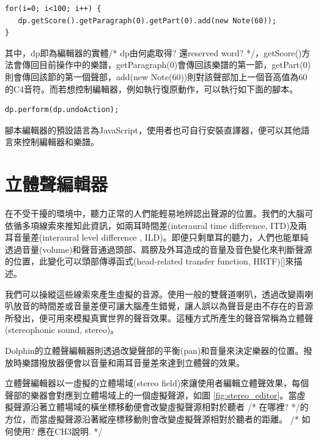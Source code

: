 \documentclass[12pt,a4paper,oneside]{report}
\begin{document}
\begin{verbatim}
for(i=0; i<100; i++) { 
   dp.getScore().getParagraph(0).getPart(0).add(new Note(60));
}
\end{verbatim}

其中，dp即為編輯器的實體/* dp由何處取得? 還reserved word?  */，getScore()方法會傳回目前操作中的樂譜，getParagraph(0)會傳回該樂譜的第一節，getPart(0)則會傳回該節的第一個聲部，add(new Note(60))則對該聲部加上一個音高值為60的C4音符。而若想控制編輯器，例如執行復原動作，可以執行如下面的腳本。

\begin{verbatim}
dp.perform(dp.undoAction);
\end{verbatim}

腳本編輯器的預設語言為JavaScript，使用者也可自行安裝直譯器，便可以其他語言來控制編輯器和樂譜。

\section{立體聲編輯器}

在不受干擾的環境中，聽力正常的人們能輕易地辨認出聲源的位置。我們的大腦可依循多項線索來推知此資訊，如兩耳時間差(interaural time difference, ITD)及兩耳音量差(interaural level difference , ILD)。即便只剩單耳的聽力，人們也能單純透過音量(volume)和聲音通過頭部、肩膀及外耳造成的音量及音色變化來判斷聲源的位置，此變化可以頭部傳導函式(head-related transfer function, HRTF)[]來描述。

我們可以操縱這些線索來產生虛擬的音源。使用一般的雙聲道喇叭，透過改變兩喇叭放音的時間差或音量差便可讓大腦產生錯覺，讓人誤以為聲音是由不存在的音源所發出，便可用來模擬真實世界的聲音效果。這種方式所產生的聲音常稱為立體聲(stereophonic sound, stereo)。

Dolphin的立體聲編輯器則透過改變聲部的平衡(pan)和音量來決定樂器的位置。撥放時樂譜撥放器便會以音量和兩耳音量差來達到立體聲的效果。

立體聲編輯器以一虛擬的立體場域(stereo field)來讓使用者編輯立體聲效果，每個聲部的樂器會對應到立體場域上的一個虛擬聲源，如圖 \ref{fig:stereo_editor}。當虛擬聲源沿著立體場域的橫坐標移動便會改變虛擬聲源相對於聽者 /* 在哪裡?  */的方位，而當虛擬聲源沿著縱座標移動則會改變虛擬聲源相對於聽者的距離。  /* 如何使用? 應在CH3說明. */
\end{document}
